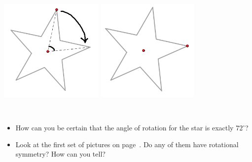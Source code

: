 \bigskip


\begin{center}
\includegraphics[height=5cm]{starrot1}
\qquad\qquad
\includegraphics[height=5cm]{starrot2}
\end{center}

\bigskip
\bigskip

\begin{thinkpair*}\
\begin{itemize}
\item
How can you be certain that the angle of rotation for the star is exactly $72^\circ$?\\

\item
Look at the first set of pictures on page~\pageref{pics:symm}.  Do any of them have rotational symmetry?  How can you tell?
\end{itemize}  
\end{thinkpair*}




\bigskip

